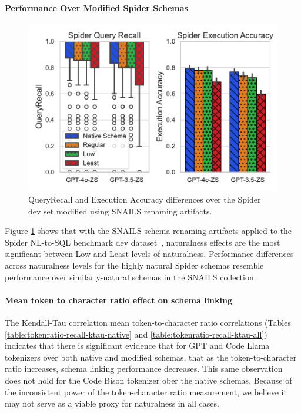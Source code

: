 \paragraph{\textbf{Performance Over Modified Spider Schemas}}

\begin{figure}
  \centering
  \includegraphics[width=\figwidthmod\linewidth]{figures/spider-combined-results.pdf}
  \caption{QueryRecall and Execution Accuracy differences over the Spider~\cite{Yu&al.18c} dev set modified using SNAILS renaming artifacts.}
  \label{fig:spiderresults}
\end{figure}

Figure \ref{fig:spiderresults} shows that with the SNAILS schema renaming artifacts applied to the Spider NL-to-SQL benchmark dev dataset~\cite{Yu&al.18c}, naturalness effects are the most significant between Low and Least levels of naturalness.
Performance differences across naturalness levels for the highly natural Spider schemas resemble performance over similarly-natural schemas in the SNAILS collection.


\paragraph{\textbf{Mean token to character ratio effect on schema linking}}

The Kendall-Tau correlation mean token-to-character ratio correlations (Tables \ref{table:tokenratio-recall-ktau-native} and \ref{table:tokenratio-recall-ktau-all}) indicates that there is significant evidence that for GPT and Code Llama tokenizers over both native and modified schemas, that as the token-to-character ratio increases, schema linking performance decreases.
This same observation does not hold for the Code Bison tokenizer ober the native schemas.
Because of the inconsistent power of the token-character ratio measurement, we believe it may not serve as a viable proxy for naturalness in all cases.


